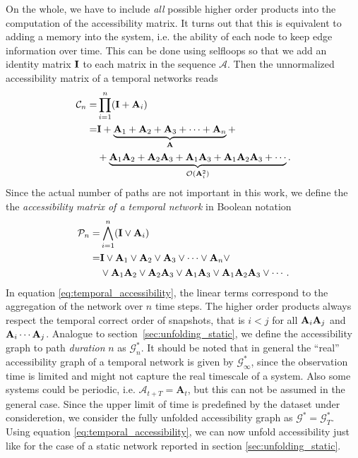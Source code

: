On the whole, we have to include \emph{all} possible higher order products into the computation of the accessibility matrix.
It turns out that this is equivalent to adding a memory into the system, i.e. the ability of each node to keep edge information over time.
This can be done using selfloops so that we add an identity matrix $\mathbf{I}$ to each matrix in the sequence $\mathcal{A}$.
Then the unnormalized accessibility matrix of a temporal networks reads
%
\begin{align*}
\mathcal{C}_n=&\prod _{i=1} ^n (\mathbf{I} + \mathbf{A}_i ) \\
=& \mathbf{I}+\underbrace{ \mathbf{A}_1+\mathbf{A}_2+\mathbf{A}_3+\cdots + \mathbf{A}_n}_{\mathbf{A}} + \nonumber \\
&+ \underbrace{\mathbf{A}_1\mathbf{A}_2+\mathbf{A}_2\mathbf{A}_3+ \mathbf{A}_1\mathbf{A}_3+ \mathbf{A}_1\mathbf{A}_2\mathbf{A}_3 +\cdots }_{\mathcal{O}(\mathbf{A}_i ^2)}\nonumber .
\end{align*}
Since the actual number of paths are not important in this work, we define the the \emph{accessibility matrix of a temporal network} in Boolean notation
%
\begin{align}
\mathcal{P}_n=&\bigwedge _{i=1} ^n (\mathbf{I} \vee \mathbf{A}_i ) \label{eq:temporal_accessibility} \\
= & \mathbf{I}\vee \mathbf{A}_1\vee \mathbf{A}_2\vee \mathbf{A}_3\vee \cdots \vee \mathbf{A}_n \vee \nonumber \\
& \vee \mathbf{A}_1\mathbf{A}_2\vee \mathbf{A}_2\mathbf{A}_3\vee  \mathbf{A}_1\mathbf{A}_3\vee  \mathbf{A}_1\mathbf{A}_2\mathbf{A}_3 \vee \cdots . \nonumber
\end{align}
%
In equation \eqref{eq:temporal_accessibility}, the linear terms correspond to the aggregation of the network over $n$ time steps.
The higher order products always respect the temporal correct order of snapshots, that is $i<j$ for all $\mathbf{A}_i\mathbf{A}_j$ and $\mathbf{A}_i \cdots \mathbf{A}_j $.
Analogue to section~\ref{sec:unfolding_static}, we define the accessibility graph to path \emph{duration} $n$ as $\mathcal{G}_n ^*$.
It should be noted that in general the ``real'' accessibility graph of a temporal network is given by $\mathcal{G}_\infty ^*$, since the observation time is limited and might not capture the real timescale of a system.
Also some systems could be periodic, i.e. $\mathcal{A}_{t+T}=\mathbf{A}_{t}$, but this can not be assumed in the general case.
Since the upper limit of time is predefined by the dataset under consideretion, we consider the fully unfolded accessibility graph as $\mathcal{G}^* = \mathcal{G}_T ^*$.
Using equation \eqref{eq:temporal_accessibility}, we can now unfold accessibility just like for the case of a static network reported in section \ref{sec:unfolding_static}.

